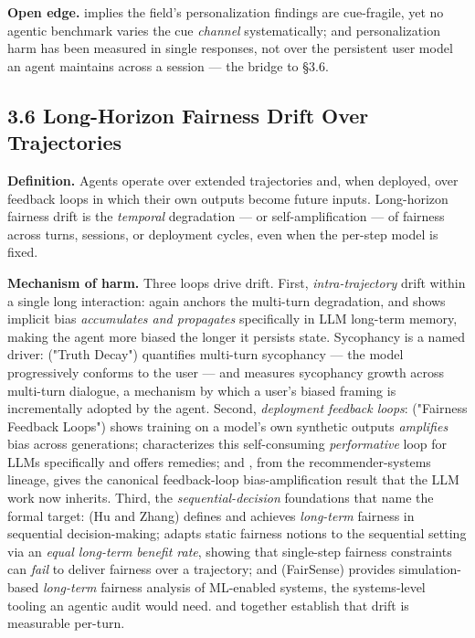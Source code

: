 \documentclass[sigconf,nonacm]{acmart}
\begin{document}
\textbf{Open edge.} \cite{tonneau2026different} implies the field's personalization findings are cue-fragile, yet no agentic benchmark varies the cue \emph{channel} systematically; and personalization harm has been measured in single responses, not over the persistent user model an agent maintains across a session — the bridge to §3.6.

\subsection{3.6 Long-Horizon Fairness Drift Over Trajectories}

\textbf{Definition.} Agents operate over extended trajectories and, when deployed, over feedback loops in which their own outputs become future inputs. Long-horizon fairness drift is the \emph{temporal} degradation — or self-amplification — of fairness across turns, sessions, or deployment cycles, even when the per-step model is fixed.

\textbf{Mechanism of harm.} Three loops drive drift. First, \emph{intra-trajectory} drift within a single long interaction: \cite{fan2024fairmt} again anchors the multi-turn degradation, and \cite{ma2026implicit} shows implicit bias \emph{accumulates and propagates} specifically in LLM long-term memory, making the agent more biased the longer it persists state. Sycophancy is a named driver: \cite{liu2025truth} ("Truth Decay") quantifies multi-turn sycophancy — the model progressively conforms to the user — and \cite{hong2025measuring} measures sycophancy growth across multi-turn dialogue, a mechanism by which a user's biased framing is incrementally adopted by the agent. Second, \emph{deployment feedback loops}: \cite{wyllie2024fairness} ("Fairness Feedback Loops") shows training on a model's own synthetic outputs \emph{amplifies} bias across generations; \cite{wang2026observations} characterizes this self-consuming \emph{performative} loop for LLMs specifically and offers remedies; and \cite{mansoury2020feedback}, from the recommender-systems lineage, gives the canonical feedback-loop bias-amplification result that the LLM work now inherits. Third, the \emph{sequential-decision} foundations that name the formal target: \cite{hu2022achieving} (Hu and Zhang) defines and achieves \emph{long-term} fairness in sequential decision-making; \cite{xu2024adapting} adapts static fairness notions to the sequential setting via an \emph{equal long-term benefit rate}, showing that single-step fairness constraints can \emph{fail} to deliver fairness over a trajectory; and \cite{she2025fairsense} (FairSense) provides simulation-based \emph{long-term} fairness analysis of ML-enabled systems, the systems-level tooling an agentic audit would need. \cite{liu2025truth} and \cite{hong2025measuring} together establish that drift is measurable per-turn.
\end{document}
